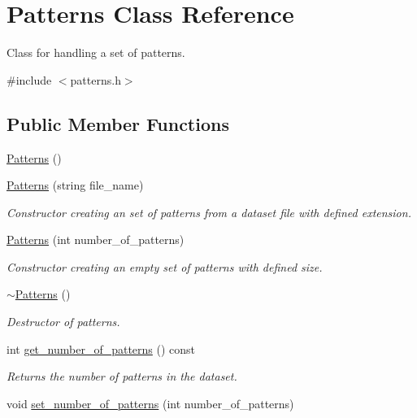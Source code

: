 \hypertarget{classPatterns}{\section{Patterns Class Reference}
\label{classPatterns}
}


Class for handling a set of patterns.  




{\ttfamily \#include $<$patterns.\+h$>$}

\subsection*{Public Member Functions}
\begin{DoxyCompactItemize}
\item 
\hyperlink{classPatterns_aa6241d95e039c41cc4f4744d2285ebd9}{Patterns} ()
\item 
\hyperlink{classPatterns_a91b41ddbe7a24c86697f5e19b93e0f75}{Patterns} (string file\+\_\+name)
\begin{DoxyCompactList}\small\item\em Constructor creating an set of patterns from a dataset file with defined extension. \end{DoxyCompactList}\item 
\hyperlink{classPatterns_ab847348dfaab14ef8a5f9dbc1a936039}{Patterns} (int number\+\_\+of\+\_\+patterns)
\begin{DoxyCompactList}\small\item\em Constructor creating an empty set of patterns with defined size. \end{DoxyCompactList}\item 
\hyperlink{classPatterns_a91257ce4caca2a7ed65d931cdaeaeb6b}{$\sim$\+Patterns} ()
\begin{DoxyCompactList}\small\item\em Destructor of patterns. \end{DoxyCompactList}\item 
int \hyperlink{classPatterns_a76a42a6d7eca37020a3481c9d3ffa214}{get\+\_\+number\+\_\+of\+\_\+patterns} () const 
\begin{DoxyCompactList}\small\item\em Returns the number of patterns in the dataset. \end{DoxyCompactList}\item 
void \hyperlink{classPatterns_abbac70e6ecb3c8677e5418ed85170fe6}{set\+\_\+number\+\_\+of\+\_\+patterns} (int number\+\_\+of\+\_\+patterns)

\end{DoxyCompactItemize}
